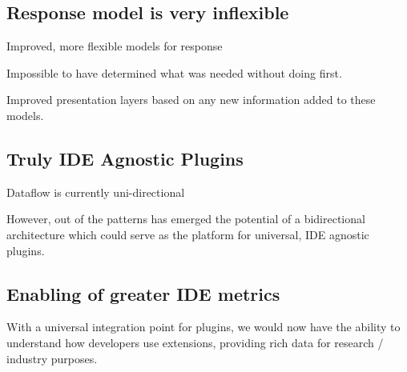 \subsection{Response model is very inflexible}

Improved, more flexible models for response

Impossible to have determined what was needed without doing first.

Improved presentation layers based on any new information added to these models.

\subsection{Truly IDE Agnostic Plugins}

Dataflow is currently uni-directional

However, out of the patterns has emerged the potential of a bidirectional architecture which could serve as the platform for universal, IDE agnostic plugins.

\subsection{Enabling of greater IDE metrics}

With a universal integration point for plugins, we would now have the ability to understand how developers use extensions, providing rich data for research / industry purposes.

